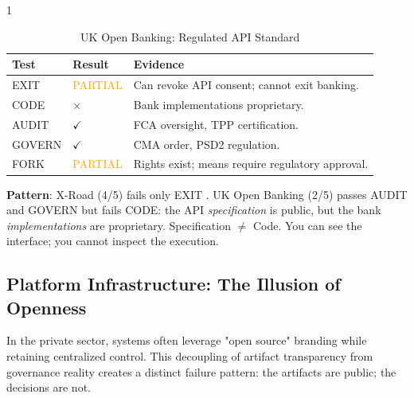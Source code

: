 \documentclass{article}
\begin{document}
\begin{table}[p]
    \begin{subtable}{1\textwidth}
        \centering
        \caption{UK Open Banking: Regulated API Standard}
        \begin{tabular}{@{}llp{7cm}@{}}
            \toprule
            \textbf{Test} & \textbf{Result} & \textbf{Evidence} \\
            \midrule
            EXIT & \textcolor{orange}{PARTIAL} & Can revoke API consent; cannot exit banking. \\
            CODE & $\times$ & Bank implementations proprietary. \\
            AUDIT & $\checkmark$ & FCA oversight, TPP certification. \\
            GOVERN & $\checkmark$ & CMA order, PSD2 regulation. \\
            FORK & \textcolor{orange}{PARTIAL} & Rights exist; means require regulatory approval. \\
            \bottomrule
        \end{tabular}
    \end{subtable}
\end{table}

\textbf{Pattern}: X-Road (4/5) fails only EXIT \citep{xroad2026}. UK Open Banking (2/5) passes AUDIT and GOVERN but fails CODE: the API \textit{specification} is public, but the bank \textit{implementations} are proprietary. Specification $\neq$ Code. You can see the interface; you cannot inspect the execution.

\subsection{Platform Infrastructure: The Illusion of Openness}

In the private sector, systems often leverage "open source" branding while retaining centralized control. This decoupling of artifact transparency from governance reality creates a distinct failure pattern: the artifacts are public; the decisions are not.
\end{document}
